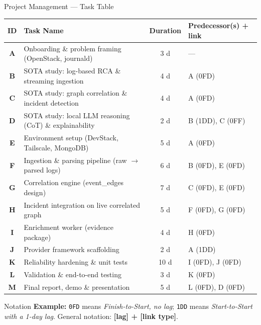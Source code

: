 \documentclass{beamer}
\newenvironment{adjustbox}[1]{\par\begingroup\centering}{\par\endgroup}%
\begin{document}
\begin{frame}{Project Management --- Task Table}
    
    \scriptsize
    \renewcommand{\arraystretch}{1.1}
    \begin{adjustbox}{max width=0.98\textwidth}
    \begin{tabular}{|c|p{5.6cm}|c|p{4.8cm}|}
        \hline
        \textbf{ID} & \textbf{Task Name} & \textbf{Duration} & \textbf{Predecessor(s) + link} \\ \hline
        \textbf{A} & Onboarding \& problem framing (OpenStack, journald) & 3 d & --- \\ \hline
        \textbf{B} & SOTA study: log-based RCA \& streaming ingestion & 4 d & A (0FD) \\ \hline
        \textbf{C} & SOTA study: graph correlation \& incident detection & 4 d & A (0FD) \\ \hline
        \textbf{D} & SOTA study: local LLM reasoning (CoT) \& explainability & 2 d & B (1DD), C (0FF) \\ \hline
        \textbf{E} & Environment setup (DevStack, Tailscale, MongoDB) & 5 d & A (0FD) \\ \hline
        \textbf{F} & Ingestion \& parsing pipeline (raw $\to$ parsed logs) & 6 d & B (0FD), E (0FD) \\ \hline
        \textbf{G} & Correlation engine (event\_edges design) & 7 d & C (0FD), E (0FD) \\ \hline
        \textbf{H} & Incident integration on live correlated graph & 5 d & F (0FD), G (0FD) \\ \hline
        \textbf{I} & Enrichment worker (evidence package) & 4 d & H (0FD) \\ \hline
        \textbf{J} & Provider framework scaffolding & 2 d & A (1DD) \\ \hline
        \textbf{K} & Reliability hardening \& unit tests & 10 d & I (0FD), J (0FD) \\ \hline
        \textbf{L} & Validation \& end-to-end testing & 3 d & K (0FD) \\ \hline
        \textbf{M} & Final report, demo \& presentation & 5 d & L (0FD), D (0FD) \\ \hline
    \end{tabular}
    \end{adjustbox}
    \vspace{0.15cm}
    \tiny
    \begin{block}{Notation}
        \textbf{Example:} \texttt{0FD} means \emph{Finish-to-Start, no lag}; \texttt{1DD} means \emph{Start-to-Start with a 1-day lag}.
        General notation: \textbf{[lag] + [link type]}.
    \end{block}
\end{frame}
\end{document}
